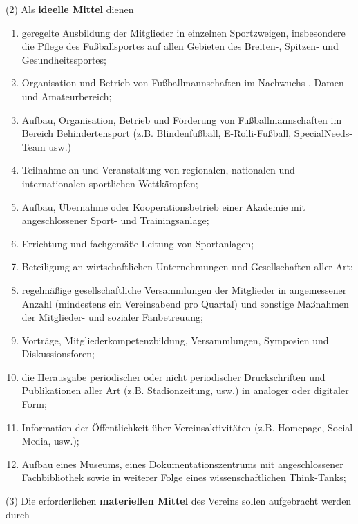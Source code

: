 \documentclass[11pt,a4paper]{article}
\begin{document}
(2)
Als \textbf{ideelle Mittel} dienen

\begin{enumerate}[label=\alph*)]
\item
geregelte Ausbildung der Mitglieder in einzelnen Sportzweigen, insbesondere die Pflege des Fußballsportes auf allen Gebieten des Breiten-, Spitzen- und Gesundheitssportes;
\item
Organisation und Betrieb von Fußballmannschaften im Nachwuchs-, Damen und Amateurbereich;
\item
Aufbau, Organisation, Betrieb und Förderung von Fußballmannschaften im Bereich Behindertensport (z.B. Blindenfußball, E-Rolli-Fußball, SpecialNeeds-Team usw.)
\item
Teilnahme an und Veranstaltung von regionalen, nationalen und internationalen sportlichen Wettkämpfen;
\item
Aufbau, Übernahme oder Kooperationsbetrieb einer Akademie mit angeschlossener Sport- und Trainingsanlage;
\item
Errichtung und fachgemäße Leitung von Sportanlagen;
\item
Beteiligung an wirtschaftlichen Unternehmungen und Gesellschaften aller Art;
\item
regelmäßige gesellschaftliche Versammlungen der Mitglieder in angemessener Anzahl (mindestens ein Vereinsabend pro Quartal) und sonstige Maßnahmen der Mitglieder- und sozialer Fanbetreuung;
\item
Vorträge, Mitgliederkompetenzbildung, Versammlungen, Symposien und Diskussionsforen;
\item
die Herausgabe periodischer oder nicht periodischer Druckschriften und Publikationen aller Art (z.B. Stadionzeitung, usw.) in analoger oder digitaler Form;
\item
Information der Öffentlichkeit über Vereinsaktivitäten (z.B. Homepage, Social Media, usw.);
\item
Aufbau eines Museums, eines Dokumentationszentrums mit angeschlossener Fachbibliothek sowie in weiterer Folge eines wissenschaftlichen Think-Tanks;
\end{enumerate}

(3)
Die erforderlichen \textbf{materiellen Mittel} des Vereins sollen aufgebracht werden durch
\end{document}
